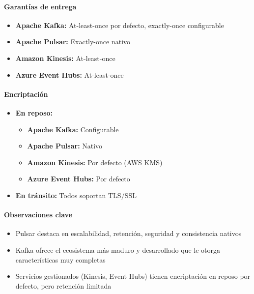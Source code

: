 \paragraph{Garantías de entrega}
\begin{itemize}
    \item \textbf{Apache Kafka:} At-least-once por defecto, exactly-once configurable
    \item \textbf{Apache Pulsar:} Exactly-once nativo
    \item \textbf{Amazon Kinesis:} At-least-once
    \item \textbf{Azure Event Hubs:} At-least-once
\end{itemize}

\paragraph{Encriptación}
\begin{itemize}
    \item \textbf{En reposo:}
    \begin{itemize}
        \item \textbf{Apache Kafka:} Configurable
        \item \textbf{Apache Pulsar:} Nativo
        \item \textbf{Amazon Kinesis:} Por defecto (AWS KMS)
        \item \textbf{Azure Event Hubs:} Por defecto
    \end{itemize}
    \item \textbf{En tránsito:} Todos soportan TLS/SSL
\end{itemize}

\paragraph{Observaciones clave}
\begin{itemize}
    \item Pulsar destaca en escalabilidad, retención, seguridad y consistencia nativos
    \item Kafka ofrece el ecosistema más maduro y desarrollado que le otorga características muy completas
    \item Servicios gestionados (Kinesis, Event Hubs) tienen encriptación en reposo por defecto, pero retención limitada
\end{itemize}
\clearpage

